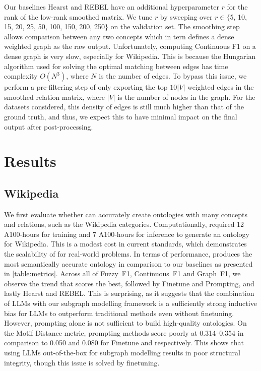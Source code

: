 Our baselines Hearst and REBEL have an additional hyperparameter $r$ for the rank of the low-rank smoothed matrix. We tune $r$ by sweeping over $r \in \{$5, 10, 15, 20, 25, 50, 100, 150, 200, 250$\}$ on the validation set. The smoothing step allows comparison between any two concepts which in tern defines a dense weighted graph as the raw output. Unfortunately, computing Continuous F1 on a dense graph is very slow, especially for Wikipedia. This is because the Hungarian algorithm used for solving the optimal matching between edges has time complexity $O(N^3)$, where $N$ is the number of edges. To bypass this issue, we perform a pre-filtering step of only exporting the top $10|V|$ weighted edges in the smoothed relation matrix, where $|V|$ is the number of nodes in the graph. For the datasets considered, this density of edges is still much higher than that of the ground truth, and thus, we expect this to have minimal impact on the final output after post-processing.

\section{Results}  \label{sec:results}



\subsection{Wikipedia}

We first evaluate whether \name can accurately create ontologies with many concepts and relations, such as the Wikipedia categories. Computationally, \name required 12 A100-hours for training and 7 A100-hours for inference to generate an ontology for Wikipedia. This is a modest cost in current standards, which demonstrates the scalability of \name for real-world problems.
In terms of performance, \name produces the most semantically accurate ontology in comparison to our baselines as presented in \cref{table:metrics}. Across all of Fuzzy~F1, Continuous~F1 and Graph~F1, we observe the trend that \name scores the best, followed by Finetune and Prompting, and lastly Hearst and REBEL. This is surprising, as it suggests that the combination of LLMs with our subgraph modelling framework is a sufficiently strong inductive bias for LLMs to outperform traditional methods even without finetuning. However, prompting alone is not sufficient to build high-quality ontologies.
On the Motif Distance metric, prompting methods score poorly at 0.314--0.354 in comparison to 0.050 and 0.080 for Finetune and \name respectively. This shows that using LLMs out-of-the-box for subgraph modelling results in poor structural integrity, though this issue is solved by finetuning.

